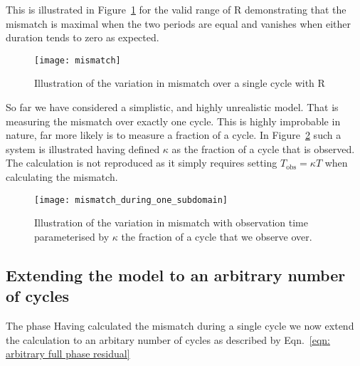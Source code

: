 This is illustrated in Figure~\ref{fig: Lyne mismatch} for the valid range of R
demonstrating that the mismatch is maximal when the two periods are equal and
vanishes when either duration tends to zero as expected.

\begin{figure}[ht]
\centering
\texttt{[image: mismatch]}
\caption{Illustration of the variation in mismatch over a single cycle with R}
\label{fig: Lyne mismatch}
\end{figure}

So far we have considered a simplistic, and highly unrealistic model. That is
measuring the mismatch over exactly one cycle. This is highly improbable in nature,
far more likely is to measure a fraction of a cycle. In Figure~\ref{fig: Lyne mismatch kappa}
such a system is illustrated having defined $\kappa$ as the fraction of a cycle that
is observed. The calculation is not reproduced as it simply requires setting 
$T_{\mathrm{obs}} = \kappa T$ when calculating the mismatch.

\begin{figure}[ht]
\centering
\texttt{[image: mismatch\_during\_one\_subdomain]}
\caption{Illustration of the variation in mismatch with observation time 
parameterised by $\kappa$ the fraction of a cycle that we observe over.}
\label{fig: Lyne mismatch kappa}
\end{figure}
\FloatBarrier

\subsection{Extending the model to an arbitrary number of cycles} The phase
Having calculated the mismatch during a single cycle we now extend the calculation
to an arbitary number of cycles as described by Eqn.~\eqref{eqn: arbitrary full phase residual}

